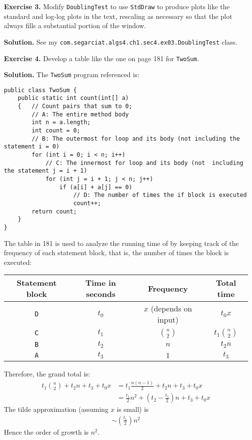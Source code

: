 \documentclass[12pt, a4paper]{article}
\newenvironment{ex}[2][Exercise]
{\par\medskip\noindent \textbf{#1 #2.}}
{\medskip}
\newenvironment{sol}[1][Solution]
{\par\medskip\noindent \textbf{#1.} }
{\medskip}
\begin{document}
	\begin{ex}{3}
		Modify \texttt{DoublingTest} to use \texttt{StdDraw} to produce
		plots like the standard and log-log plots in the text, rescaling as
		necessary so that the plot always fills a substantial portion of the
		window.
	\end{ex}
	\begin{sol}
		See my \texttt{com.segarciat.algs4.ch1.sec4.ex03.DoublingTest} class.
	\end{sol}
	\begin{ex}{4}
		Develop a table like the one on page 181 for \texttt{TwoSum}.
	\end{ex}
	\begin{sol}
		The \texttt{TwoSum} program referenced is:
		\begin{lstlisting}
public class TwoSum {
	public static int count(int[] a)
	{   // Count pairs that sum to 0;
		// A: The entire method body
		int n = a.length;
		int count = 0;
		// B: The outermost for loop and its body (not including the statement i = 0)
		for (int i = 0; i < n; i++)
			// C: The innermost for loop and its body (not  including the statement j = i + 1)
			for (int j = i + 1; j < n; j++)
				if (a[i] + a[j] == 0)
					// D: The number of times the if block is executed
					count++;
		return count;	
	}
}
		\end{lstlisting}
		The table in 181 is used to analyze the running time of by keeping track of
		the frequency of each statement block, that is, the number of times the
		block is executed:
		\begin{center}
			\begin{tabular}{cccc}
				\textbf{Statement block} & \textbf{Time in seconds} & \textbf{Frequency} & \textbf{Total time}\\
				\hline
				\texttt{D} & $t_0$ & $x$ (depends on input) & $t_0x$ \\
				\texttt{C} & $t_1$ & $\binom{n}{2}$ & $t_1\binom{n}{2}$ \\
				\texttt{B} & $t_2$ & $n$ & $t_2n$\\
				\texttt{A} & $t_3$ & $1$ & $t_3$
			\end{tabular}
		\end{center}
		Therefore, the grand total is:
		\begin{align*}
			t_1\binom{n}{2} + t_2n+t_3+t_0x &= t_1\frac{n(n-1)}{2} + t_2n+t_3+t_0x\\
			&=\frac{t_1}{2}n^2+\left(t_2-\frac{t_1}{2}\right)n+t_3+t_0x
		\end{align*}
		The tilde approximation (assuming $x$ is small) is
		\begin{align*}
			\sim\left(\frac{t_1}{2}\right)n^2
		\end{align*}
		Hence the order of growth is $n^2$.
	\end{sol}
\end{document}

